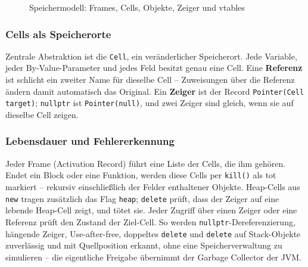 \documentclass[11pt,a4paper,parskip=half,headsepline,toc=flat]{scrartcl}
\newcommand{\code}[1]{\texttt{#1}}
\begin{document}
\begin{figure}[htbp]
\caption{Speichermodell: Frames, Cells, Objekte, Zeiger und vtables}
\end{figure}

\subsubsection*{Cells als Speicherorte}
Zentrale Abstraktion ist die \code{Cell}, ein veränderlicher Speicherort. Jede Variable, jeder By-Value-Parameter und
jedes Feld besitzt genau eine Cell. Eine \textbf{Referenz} ist schlicht ein zweiter Name für dieselbe Cell --
Zuweisungen über die Referenz ändern damit automatisch das Original. Ein \textbf{Zeiger} ist der Record
\code{Pointer(Cell target)}; \code{nullptr} ist \code{Pointer(null)}, und zwei Zeiger sind gleich, wenn sie auf
dieselbe Cell zeigen.

\subsubsection*{Lebensdauer und Fehlererkennung}
Jeder Frame (Activation Record) führt eine Liste der Cells, die ihm gehören. Endet ein Block oder eine Funktion,
werden diese Cells per \code{kill()} als tot markiert -- rekursiv einschließlich der Felder enthaltener Objekte.
Heap-Cells aus \code{new} tragen zusätzlich das Flag \code{heap}; \code{delete} prüft, dass der Zeiger auf eine
lebende Heap-Cell zeigt, und tötet sie. Jeder Zugriff über einen Zeiger oder eine Referenz prüft den Zustand der
Ziel-Cell. So werden \code{nullptr}-Dereferenzierung, hängende Zeiger, Use-after-free, doppeltes \code{delete} und
\code{delete} auf Stack-Objekte zuverlässig und mit Quellposition erkannt, ohne eine Speicherverwaltung zu simulieren
-- die eigentliche Freigabe übernimmt der Garbage Collector der JVM.
\end{document}
